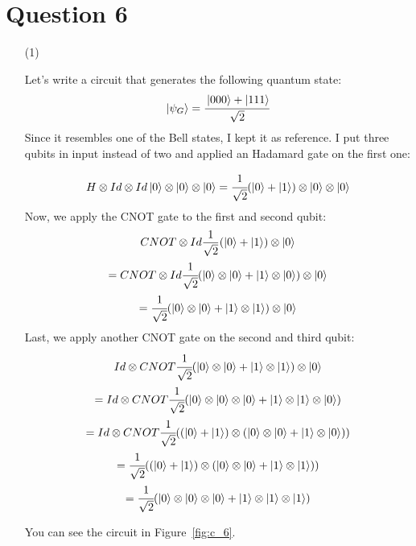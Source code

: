 \documentclass[12pt]{article}
\begin{document}
\section*{Question 6}
\begin{itemize}

\item[(1)]

Let's write a circuit that generates the following quantum state:
\begin{gather*}
    \ket{\psi_G} = \cfrac{\ket{000} + \ket{111}}{\sqrt{2}}
\end{gather*}
Since it resembles one of the Bell states, I kept it as reference. I put three qubits 
in input instead of two and applied an Hadamard gate on the first one:

\begin{gather*}
    H \otimes Id \otimes Id \ket{0} \otimes \ket{0} \otimes \ket{0} = \cfrac{1}{\sqrt{2}} (\ket 0 + \ket 1) \otimes \ket 0 \otimes \ket 0
\end{gather*}
Now, we apply the CNOT gate to the first and second qubit:
\begin{gather*}
    CNOT \otimes Id \frac{1}{\sqrt{2}} (\ket 0 + \ket 1) \otimes \ket 0 \\
    = CNOT \otimes Id \cfrac{1}{\sqrt{2}} (\ket{0} \otimes \ket{0} + \ket{1} \otimes \ket{0}) \otimes \ket{0} \\
    = \cfrac{1}{\sqrt{2}} (\ket{0} \otimes \ket{0} + \ket{1} \otimes \ket{1}) \otimes \ket{0}
\end{gather*}
Last, we apply another CNOT gate on the second and third qubit:
\begin{gather*}
    Id \otimes CNOT \cfrac{1}{\sqrt{2}} (\ket{0} \otimes \ket{0} + \ket{1} \otimes \ket{1}) \otimes \ket{0} \\
    = Id \otimes CNOT \cfrac{1}{\sqrt{2}} (\ket{0} \otimes \ket{0} \otimes \ket{0} + \ket{1} \otimes \ket{1} \otimes \ket{0}) \\
    = Id \otimes CNOT \cfrac{1}{\sqrt{2}} ((\ket{0} + \ket{1}) \otimes (\ket{0} \otimes \ket{0} + \ket{1} \otimes \ket{0})) \\
    =\cfrac{1}{\sqrt{2}} ((\ket{0} + \ket{1}) \otimes (\ket{0} \otimes \ket{0} + \ket{1} \otimes \ket{1})) \\
    =\cfrac{1}{\sqrt{2}} (\ket{0} \otimes \ket{0} \otimes \ket{0} + \ket{1} \otimes \ket{1} \otimes \ket{1})
\end{gather*}

You can see the circuit in Figure~\ref{fig:c_6}.


\end{itemize}
\end{document}

